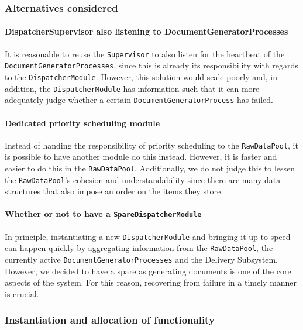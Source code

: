 \documentclass[a4paper,10pt]{article}
\begin{document}
\subsubsection*{Alternatives considered}
\paragraph{DispatcherSupervisor also listening to DocumentGeneratorProcesses}
It is reasonable to reuse the \texttt{Supervisor} to also listen for the heartbeat of the \texttt{DocumentGeneratorProcesses}, since this is already its responsibility with regards to the \texttt{DispatcherModule}. However, this solution would scale poorly and, in addition, the \texttt{DispatcherModule} has information such that it can more adequately judge whether a certain \texttt{DocumentGeneratorProcess} has failed.

\paragraph{Dedicated priority scheduling module}
Instead of handing the responsibility of priority scheduling to the \texttt{RawDataPool}, it is possible to have another module do this instead. However, it is faster and easier to do this in the \texttt{RawDataPool}. Additionally, we do not judge this to lessen the \texttt{RawDataPool}'s cohesion and understandability since there are many data structures that also impose an order on the items they store. 

\paragraph{Whether or not to have a \texttt{SpareDispatcherModule}}
In principle, instantiating a new \texttt{DispatcherModule} and bringing it up to speed can happen quickly by aggregating information from the \texttt{RawDataPool}, the currently active \texttt{DocumentGeneratorProcesses} and the Delivery Subsystem. However, we decided to have a spare as generating documents is one of the core aspects of the system. For this reason, recovering from failure in a timely manner is crucial.

\subsubsection{Instantiation and allocation of functionality}
\end{document}
